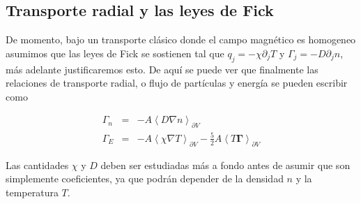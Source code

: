 \subsection{Transporte radial y las leyes de Fick}

  De momento, bajo un transporte cl\'asico donde el campo magn\'etico es homogeneo asumimos que las leyes de Fick se sostienen tal que $q_j = -\chi\partial_j T$ y $\Gamma_j = -D\partial_j n$, m\'as adelante justificaremos esto. De aqu\'i se puede ver que finalmente las relaciones de transporte radial, o flujo de part\'iculas y energ\'ia se pueden escribir como

  \begin{eqnarray}
    \Gamma_n &=& -A\left<D\nabla n\right>_{\partial V}\\
    \Gamma_E &=& -A\left<\chi\nabla T\right>_{\partial V} - \frac{5}{2}A\left<T\pmb{\Gamma}\right>_{\partial V}
    \end{eqnarray}
    
  Las cantidades $\chi$ y $D$ deben ser estudiadas m\'as a fondo antes de asumir que son simplemente coeficientes, ya que podr\'an depender de la densidad $n$ y la temperatura $T$.
